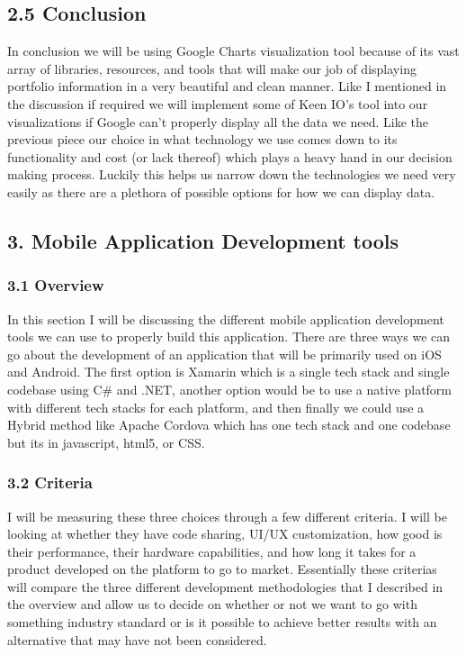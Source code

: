 \documentclass[onecolumn, draftclsnofoot,10pt, compsoc]{IEEEtran}
\begin{document}
\subsection{2.5 Conclusion}
In conclusion we will be using Google Charts visualization tool because of its vast array of libraries, resources, and tools that will make our job of displaying portfolio information in a very beautiful and clean manner. Like I mentioned in the discussion if required we will implement some of Keen IO’s tool into our visualizations if Google can’t properly display all the data we need. Like the previous piece our choice in what technology we use comes down to its functionality and cost (or lack thereof) which plays a heavy  hand in our decision making process. Luckily this helps us narrow down the technologies we need very easily as there are a plethora of possible options for how we can display data. 


\subsection{3. Mobile Application Development tools }

\subsubsection{3.1 Overview}
In this section I will be discussing the different mobile application development tools we can use to properly build this application. There are three ways we can go about the development of an application that will be primarily used on iOS and Android. The first option is Xamarin which is a single tech stack and single codebase using C\# and .NET, another option would be to use a native platform with different tech stacks for each platform, and then finally we could use a Hybrid method like Apache Cordova which has one tech stack and one codebase but its in javascript, html5, or CSS.

\subsubsection{3.2 Criteria}
I will be measuring these three choices through a few different criteria. I will be looking at whether they have code sharing, UI/UX customization, how good is their performance, their hardware capabilities, and how long it takes for a product developed on the platform to go to market. Essentially these criterias will compare the three different development methodologies that I described in the overview and allow us to decide on whether or not we want to go with something industry standard or is it possible to achieve better results with an alternative that may have not been considered. 
\end{document}
